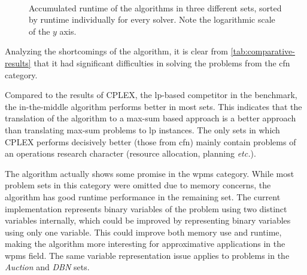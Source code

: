 \begin{figure}[tp]
	\begin{figcenter}
	\end{figcenter}
	\\
	\begin{figcenter}
	\subfloat[The \emph{DBN} set of the \gls{mrf} category.\label{fig:cactus-std:dbn}]{}
	\end{figcenter}
	\caption{Accumulated runtime of the algorithms in three different sets, sorted by runtime individually for every solver. Note the logarithmic scale of the \(y\) axis.}
	\label{fig:cactus-std}
\end{figure}

Analyzing the shortcomings of the algorithm, it is clear from \cref{tab:comparative-results} that it had significant difficulties in solving the problems from the \gls{cfn} category.



Compared to the results of CPLEX, the \gls{lp}-based competitor in the benchmark, the in-the-middle algorithm performs better in most sets.
This indicates that the translation of the algorithm to a max-sum based approach is a better approach than translating max-sum problems to \gls{lp} instances.
The only sets in which CPLEX performs decisively better (those from \gls{cfn}) mainly contain problems of an operations research character (resource allocation, planning \emph{etc.}).

The algorithm actually shows some promise in the \gls{wpms} category.
While most problem sets in this category were omitted due to memory concerns, the algorithm has good runtime performance in the remaining set.
The current implementation represents binary variables of the problem using two distinct variables internally, which could be improved by representing binary variables using only one variable.
This could improve both memory use and runtime, making the algorithm more interesting for approximative applications in the \gls{wpms} field.
The same variable representation issue applies to problems in the \emph{Auction} and \emph{DBN} sets.

